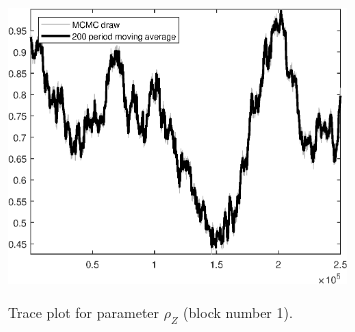 \begin{figure}[H]
\centering
  \includegraphics[width=0.8\textwidth]{BRS_aggregate/graphs/TracePlot_rho_Z_blck_1}\\
    \caption{Trace plot for parameter ${\rho_Z}$ (block number 1).}
\end{figure}
